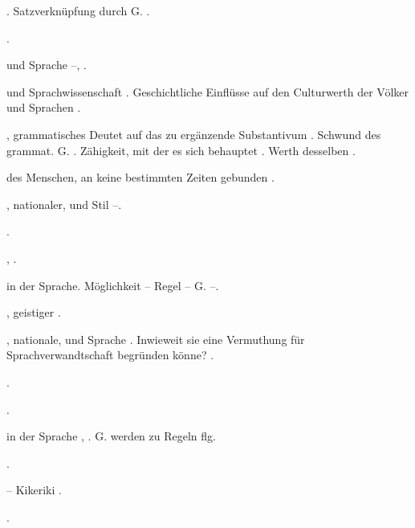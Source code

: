 \begin{register}
. Satzverknüpfung durch G. \pageref{sp.466}.

 \pageref{sp.325}.

 und Sprache \pageref{sp.309}–\pageref{sp.310}, \pageref{sp.311}.


 und Sprachwissenschaft \pageref{sp.13}. Geschichtliche Einflüsse auf den Culturwerth der Völker und Sprachen \pageref{sp.395}.

, grammatisches\pageref{sp.160} Deutet auf das zu ergänzende Substantivum \pageref{sp.237}. Schwund des grammat. G. \pageref{sp.254}.  Zähigkeit, mit der es sich behauptet \pageref{sp.364}. Werth desselben \pageref{sp.391}.

 des Menschen, an keine bestimmten Zeiten gebunden \pageref{sp.306}.

, nationaler, und Stil \pageref{sp.105}–\pageref{sp.106}.

 \pageref{sp.235}.

 \pageref{sp.309}, \pageref{sp.472}.


 in der Sprache. Möglichkeit – Regel – G. \pageref{sp.385}–\pageref{sp.387}.

, geistiger \pageref{sp.325}.

, nationale, und Sprache \pageref{sp.17}. Inwieweit sie eine Vermuthung für Sprachverwandtschaft begründen könne? \pageref{sp.148}.

 \pageref{sp.473}.


 \pageref{sp.107}.


 in der Sprache \pageref{sp.39}, \pageref{sp.182}. G. werden zu Regeln \pageref{sp.382} flg.

 \pageref{sp.160}.

 – Kikeriki \pageref{sp.208}.

 \pageref{sp.147}.



\end{register}
